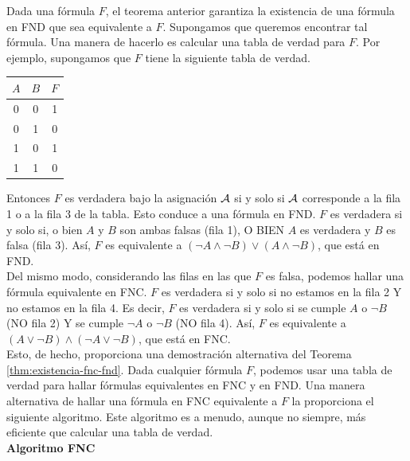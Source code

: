 \documentclass[12pt,a4paper]{book}
\begin{document}
    Dada una fórmula $F$, el teorema anterior garantiza la existencia de una fórmula en FND que sea equivalente a $F$.
    Supongamos que queremos encontrar tal fórmula. Una manera de hacerlo es calcular una tabla de verdad para $F$. Por
    ejemplo, supongamos que $F$ tiene la siguiente tabla de verdad.

    \begin{center}
    \renewcommand{\arraystretch}{1.5}
    \begin{tabular}{c | c | c}
        $A$ & $B$ & $F$\\
        \hline
        0 & 0 & 1\\
        0 & 1 & 0\\
        1 & 0 & 1\\
        1 & 1 & 0\\
    \end{tabular}
    \end{center}

    Entonces $F$ es verdadera bajo la asignación $\AA$ si y solo si $\AA$ corresponde a la fila 1 o a la fila 3 de la tabla.
    Esto conduce a una fórmula en FND. $F$ es verdadera si y solo si, o bien $A$ y $B$ son ambas falsas (fila 1), O BIEN $A$ es
    verdadera y $B$ es falsa (fila 3). Así, $F$ es equivalente a $(\neg A\wedge\neg B)\vee(A\wedge\neg B)$, que está en FND.\\
    Del mismo modo, considerando las filas en las que $F$ es falsa, podemos hallar una fórmula equivalente en FNC. $F$ es
    verdadera si y solo si no estamos en la fila 2 Y no estamos en la fila 4. Es decir, $F$ es verdadera si y solo si se
    cumple $A$ o $\neg B$ (NO fila 2) Y se cumple $\neg A$ o $\neg B$ (NO fila 4). Así, $F$ es equivalente a
    $(A\vee\neg B)\wedge(\neg A\vee\neg B)$, que está en FNC.\\
    Esto, de hecho, proporciona una demostración alternativa del Teorema \ref{thm:existencia-fnc-fnd}. Dada cualquier fórmula
    $F$, podemos usar una tabla de verdad para hallar fórmulas equivalentes en FNC y en FND. Una manera alternativa de hallar
    una fórmula en FNC equivalente a $F$ la proporciona el siguiente algoritmo. Este algoritmo es a menudo, aunque no siempre,
    más eficiente que calcular una tabla de verdad.\\

    \noindent\textbf{Algoritmo FNC}
\end{document}
